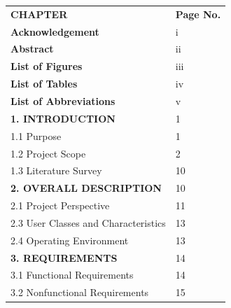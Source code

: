 \documentclass[12pt,a4paper]{report}
\begin{document}
\begin{tabular}{ll}
    \large \textbf{CHAPTER} & \textbf{Page No.} \\
    \textbf{Acknowledgement} & \hspace{0.8cm}i \\
    \textbf{Abstract} & \hspace{0.8cm}ii \\
    \textbf{List of Figures} & \hspace{0.8cm}iii \\
    \textbf{List of Tables} & \hspace{0.8cm}iv \\
    \textbf{List of Abbreviations} & \hspace{0.8cm}v \\[0.5cm]
    \textbf{1. INTRODUCTION} & \hspace{0.8cm}1 \\
    \hspace{0.5cm} 1.1 Purpose & \hspace{0.8cm}1 \\
    \hspace{0.5cm} 1.2 Project Scope & \hspace{0.8cm}2 \\
    \hspace{0.5cm} 1.3 Literature Survey & \hspace{0.8cm}10 \\[0.5cm]
    \textbf{2. OVERALL DESCRIPTION} & \hspace{0.8cm}10 \\
    \hspace{0.5cm} 2.1 Project Perspective & \hspace{0.8cm}11 \\
    \hspace{0.5cm} 2.3 User Classes and Characteristics & \hspace{0.8cm}13 \\
    \hspace{0.5cm} 2.4 Operating Environment & \hspace{0.8cm}13 \\[0.5cm]
    \textbf{3. REQUIREMENTS} & \hspace{0.8cm}14 \\
    \hspace{0.5cm} 3.1 Functional Requirements & \hspace{0.8cm}14 \\
    \hspace{0.5cm} 3.2 Nonfunctional Requirements & \hspace{0.8cm}15 \\

\end{tabular}
\end{document}
